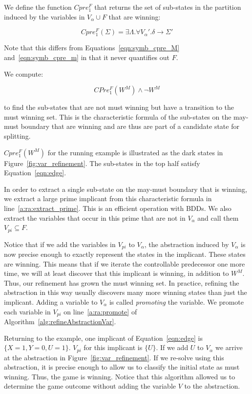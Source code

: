 We define the function $Cpre_1^F$ that returns the set of sub-states in the partition induced by the variables in $V_{\alpha} \cup F$ that are winning:

\begin{equation}
    Cpre_1^F(\Sigma) = \exists \Lambda. \forall V_\alpha'. \delta \rightarrow \Sigma'
\end{equation}

Note that this differs from Equations~\ref{eqn:symb_cpre_M} and~\ref{eqn:symb_cpre_m} in that it never quantifies out $F$. 

We compute:

\begin{equation}
    CPre_1^F(W^M) \wedge \neg W^M
    \label{eqn:edge}
\end{equation}

\noindent to find the sub-states that are not must winning but have a transition to the must winning set. This is the characteristic formula of the sub-states on the may-must boundary that are winning and are thus are part of a candidate state for splitting.

$Cpre_1^F(W^M)$ for the running example is illustrated as the dark states in Figure~\ref{fig:var_refinement}. The sub-states in the top half satisfy Equation~\ref{eqn:edge}.

In order to extract a single sub-state on the may-must boundary that is winning, we extract a large prime implicant from this characteristic formula in line~\ref{a:ra:extract_prime}. This is an efficient operation with BDDs. We also extract the variables that occur in this prime that are not in $V_\alpha$ and call them $V_{pi} \subseteq F$. 

Notice that if we add the variables in $V_{pi}$ to $V_\alpha$, the abstraction induced by $V_\alpha$ is now precise enough to exactly represent the states in the implicant. These states are winning. This means that if we iterate the controllable predecessor one more time, we will at least discover that this implicant is winning, in addition to $W^M$. Thus, our refinement has grown the must winning set. In practice, refining the abstraction in this way usually discovers many more winning states than just the implicant. Adding a variable to $V_\alpha$ is called \emph{promoting} the variable. We promote each variable in $V_{pi}$ on line~\ref{a:ra:promote} of Algorithm~\ref{alg:refineAbstractionVar}.

Returning to the example, one implicant of Equation~\ref{eqn:edge} is $\{X=1, Y=0, U=1\}$. $V_{pi}$ for this implicant is $\{U\}$. If we add $U$ to $V_\alpha$ we arrive at the abstraction in Figure~\ref{fig:var_refinement}. If we re-solve using this abstraction, it is precise enough to allow us to classify the initial state as must winning. Thus, the game is winning. Notice that this algorithm allowed us to determine the game outcome without adding the variable $V$ to the abstraction. 

